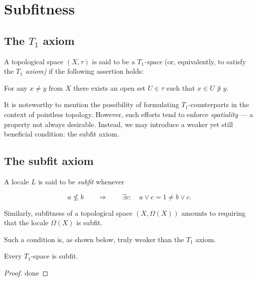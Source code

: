 \chapter{Subfitness}

\section{The $T_1$ axiom}

\begin{df}[$T_1$]
  A topological space $(X, \tau)$ is said to be a {\sl $T_1$-space\/} (or,
  equivalently, to satisfy the {\sl $T_1$ axiom)\/} if the following assertion
  holds:

  \begin{center}
    For any $x \ne y$ from $X$ there exists an open set $U \in \tau$ such that $x
    \in U \not\owns y$.
  \end{center}
\end{df}

It is noteworthy to mention the possibility of formulating $T_1$-counterparts
in the context of pointless topology.
However, such efforts tend to enforce {\sl spatiality\/} --- a property not
always desirable.
Instead, we may introduce a weaker yet still beneficial condition: the subfit
axiom.

\section{The subfit axiom}

\begin{df}[Sfit]
  A locale $L$ is said to be {\sl subfit\/} whenever

  \[
    a \not\le b \qquad \Rightarrow \qquad \exists c: \quad a \vee c = 1 \ne b
    \vee c.
  \]
\end{df}

Similarly, subfitness of a topological space $(X, \Omega(X))$ amounts to
requiring that the locale $\Omega(X)$ is subfit.

Such a condition is, as shown below, truly weaker than the $T_1$ axiom.

\begin{prop}
  Every $T_1$-space is subfit.
\end{prop}

\begin{proof}
  done
\end{proof}
